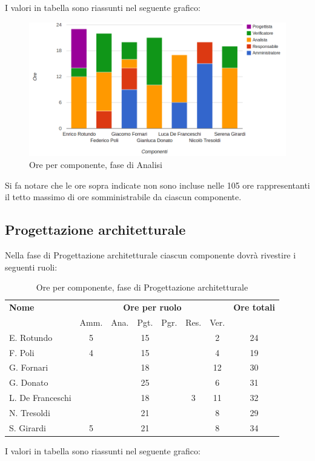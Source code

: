 I valori in tabella sono riassunti nel seguente grafico: \\ 

\begin{figure}[H]
\centering
\includegraphics[scale=0.35]{4-1.png}
\caption{Ore per componente, fase di Analisi\label{fig:nome}}
\end{figure}

Si fa notare che le ore sopra indicate non sono incluse nelle 105 ore rappresentanti il tetto massimo di ore somministrabile da ciascun componente.

\subsection{Progettazione architetturale}

Nella fase di Progettazione architetturale ciascun componente dovrà rivestire i seguenti ruoli:

\begin{table}[H]
\centering
\begin{tabular}{lccccccc}
\toprule 
    \textbf{Nome}  & \multicolumn{6}{c}{\textbf{Ore per ruolo}} & \textbf{Ore totali} \\
     & Amm. & Ana. & Pgt. & Pgr. & Res. & Ver. \\
    \midrule
    E. Rotundo   	& 5 &  &	 15	& &   &	2 &	24 \\
    F. Poli  		& 4	&  &	 15	& &   & 4 & 19 \\
    G. Fornari		& 	&  &	 18	& &   &	12 & 30 \\
    G. Donato 		& 	&  &	 25	& &   &	6 & 31 \\
    L. De Franceschi 	& 	&  &	 18	& & 3 &	11 & 32 \\
    N. Tresoldi 		& 	&  &	 21	& &   & 8 & 29 \\
   	S. Girardi 		& 5	&  &	 21	& &   &	8 & 34 \\
    
    \bottomrule
\end{tabular}
\caption{Ore per componente, fase di Progettazione architetturale}
\end{table}
I valori in tabella sono riassunti nel seguente grafico: \\ \\ \\

